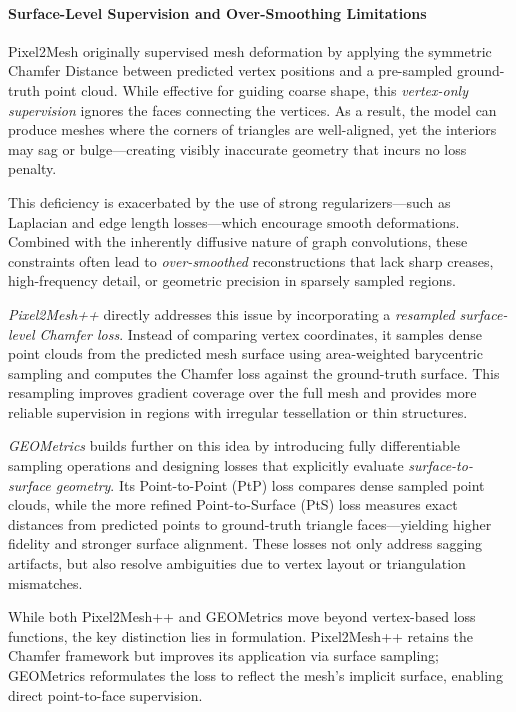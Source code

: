 \paragraph{Surface-Level Supervision and Over-Smoothing Limitations}

Pixel2Mesh originally supervised mesh deformation by applying the symmetric Chamfer Distance between predicted vertex positions and a pre-sampled ground-truth point cloud. While effective for guiding coarse shape, this \emph{vertex-only supervision} ignores the faces connecting the vertices. As a result, the model can produce meshes where the corners of triangles are well-aligned, yet the interiors may sag or bulge—creating visibly inaccurate geometry that incurs no loss penalty.

This deficiency is exacerbated by the use of strong regularizers—such as Laplacian and edge length losses—which encourage smooth deformations. Combined with the inherently diffusive nature of graph convolutions, these constraints often lead to \emph{over-smoothed} reconstructions that lack sharp creases, high-frequency detail, or geometric precision in sparsely sampled regions.

\emph{Pixel2Mesh++} \cite{wen2019_pixel2meshplusplus} directly addresses this issue by incorporating a \emph{resampled surface-level Chamfer loss}. Instead of comparing vertex coordinates, it samples dense point clouds from the predicted mesh surface using area-weighted barycentric sampling and computes the Chamfer loss against the ground-truth surface. This resampling improves gradient coverage over the full mesh and provides more reliable supervision in regions with irregular tessellation or thin structures. 

\emph{GEOMetrics} \cite{smith2019_geometric} builds further on this idea by introducing fully differentiable sampling operations and designing losses that explicitly evaluate \emph{surface-to-surface geometry}. Its Point-to-Point (PtP) loss compares dense sampled point clouds, while the more refined Point-to-Surface (PtS) loss measures exact distances from predicted points to ground-truth triangle faces—yielding higher fidelity and stronger surface alignment. These losses not only address sagging artifacts, but also resolve ambiguities due to vertex layout or triangulation mismatches.

While both Pixel2Mesh++ and GEOMetrics move beyond vertex-based loss functions, the key distinction lies in formulation. Pixel2Mesh++ retains the Chamfer framework but improves its application via surface sampling; GEOMetrics reformulates the loss to reflect the mesh's implicit surface, enabling direct point-to-face supervision.

